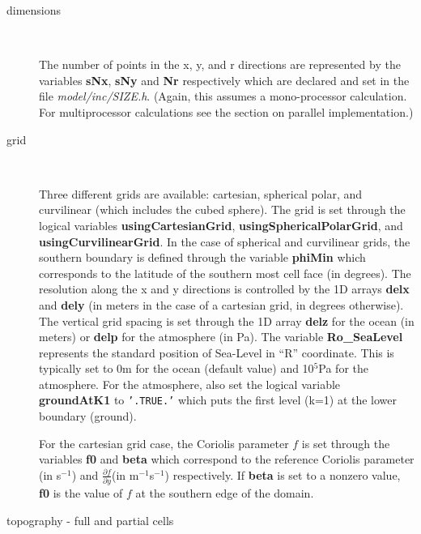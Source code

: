 \begin{description}
\item[dimensions] \ 
  
  The number of points in the x, y, and r directions are represented
  by the variables \textbf{sNx}, \textbf{sNy} and \textbf{Nr}
  respectively which are declared and set in the file
  \textit{model/inc/SIZE.h}.  (Again, this assumes a mono-processor
  calculation. For multiprocessor calculations see the section on
  parallel implementation.)

\item[grid] \ 
  
  Three different grids are available: cartesian, spherical polar, and
  curvilinear (which includes the cubed sphere). The grid is set
  through the logical variables \textbf{usingCartesianGrid},
  \textbf{usingSphericalPolarGrid}, and \textbf{usingCurvilinearGrid}.
  In the case of spherical and curvilinear grids, the southern
  boundary is defined through the variable \textbf{phiMin} which
  corresponds to the latitude of the southern most cell face (in
  degrees). The resolution along the x and y directions is controlled
  by the 1D arrays \textbf{delx} and \textbf{dely} (in meters in the
  case of a cartesian grid, in degrees otherwise).  The vertical grid
  spacing is set through the 1D array \textbf{delz} for the ocean (in
  meters) or \textbf{delp} for the atmosphere (in Pa).  The variable
  \textbf{Ro\_SeaLevel} represents the standard position of Sea-Level
  in ``R'' coordinate. This is typically set to 0m for the ocean
  (default value) and 10$^{5}$Pa for the atmosphere. For the
  atmosphere, also set the logical variable \textbf{groundAtK1} to
  \texttt{'.TRUE.'} which puts the first level (k=1) at the lower
  boundary (ground).
  
  For the cartesian grid case, the Coriolis parameter $f$ is set
  through the variables \textbf{f0} and \textbf{beta} which correspond
  to the reference Coriolis parameter (in s$^{-1}$) and
  $\frac{\partial f}{ \partial y}$(in m$^{-1}$s$^{-1}$) respectively.
  If \textbf{beta } is set to a nonzero value, \textbf{f0} is the
  value of $f$ at the southern edge of the domain.

\item[topography - full and partial cells] \ 
  

\end{description}
